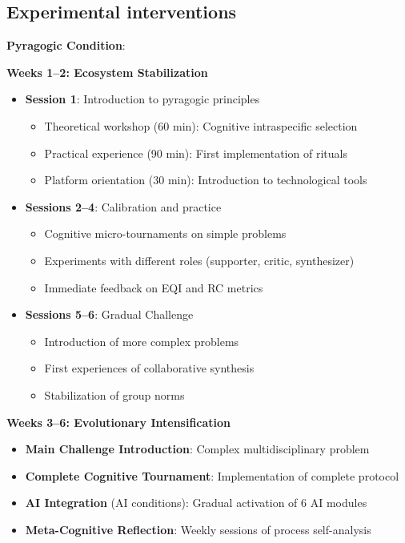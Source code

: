 \subsection{Experimental interventions}

\textbf{Pyragogic Condition}:

\textbf{Weeks 1--2: Ecosystem Stabilization}
\begin{itemize}
    \item \textbf{Session 1}: Introduction to pyragogic principles
        \begin{itemize}
            \item Theoretical workshop (60 min): Cognitive intraspecific selection
            \item Practical experience (90 min): First implementation of rituals
            \item Platform orientation (30 min): Introduction to technological tools
        \end{itemize}
    \item \textbf{Sessions 2--4}: Calibration and practice
        \begin{itemize}
            \item Cognitive micro-tournaments on simple problems
            \item Experiments with different roles (supporter, critic, synthesizer)
            \item Immediate feedback on EQI and RC metrics
        \end{itemize}
    \item \textbf{Sessions 5--6}: Gradual Challenge
        \begin{itemize}
            \item Introduction of more complex problems
            \item First experiences of collaborative synthesis
            \item Stabilization of group norms
        \end{itemize}
\end{itemize}

\textbf{Weeks 3--6: Evolutionary Intensification}
\begin{itemize}
    \item \textbf{Main Challenge Introduction}: Complex multidisciplinary problem
    \item \textbf{Complete Cognitive Tournament}: Implementation of complete protocol
    \item \textbf{AI Integration} (AI conditions): Gradual activation of 6 AI modules
    \item \textbf{Meta-Cognitive Reflection}: Weekly sessions of process self-analysis
\end{itemize}

